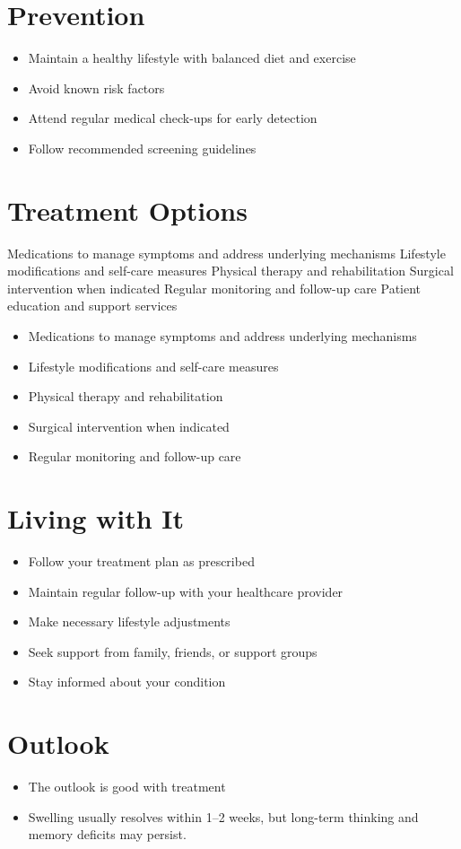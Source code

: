 \section{Prevention}
\begin{itemize}[noitemsep]
  \item Maintain a healthy lifestyle with balanced diet and exercise
  \item Avoid known risk factors
  \item Attend regular medical check-ups for early detection
  \item Follow recommended screening guidelines
\end{itemize}
\section{Treatment Options}
Medications to manage symptoms and address underlying mechanisms Lifestyle modifications and self-care measures Physical therapy and rehabilitation Surgical intervention when indicated Regular monitoring and follow-up care Patient education and support services

\begin{itemize}[noitemsep]
  \item Medications to manage symptoms and address underlying mechanisms
  \item Lifestyle modifications and self-care measures
  \item Physical therapy and rehabilitation
  \item Surgical intervention when indicated
  \item Regular monitoring and follow-up care
\end{itemize}
\section{Living with It}
\begin{itemize}[noitemsep]
  \item Follow your treatment plan as prescribed
  \item Maintain regular follow-up with your healthcare provider
  \item Make necessary lifestyle adjustments
  \item Seek support from family, friends, or support groups
  \item Stay informed about your condition
\end{itemize}
\section{Outlook}
\begin{itemize}[noitemsep]
  \item The outlook is good with treatment
  \item Swelling usually resolves within 1--2 weeks, but long-term thinking and memory deficits may persist.
\end{itemize}
